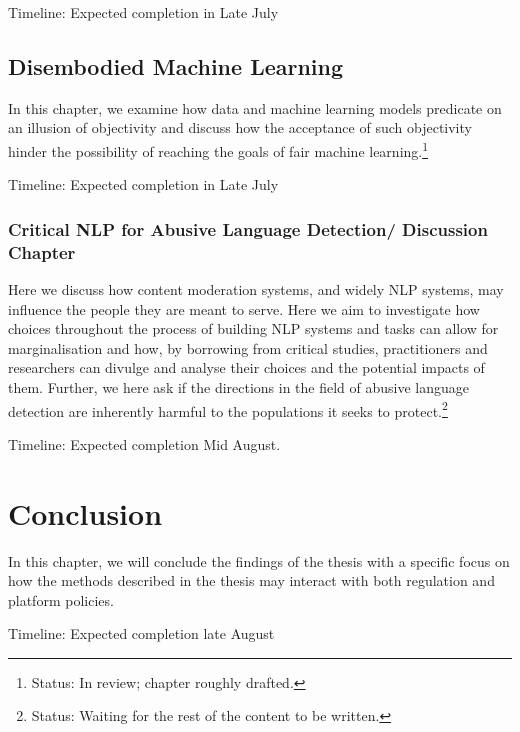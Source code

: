 {Timeline: Expected completion in Late July

\subsection{Disembodied Machine Learning}
In this chapter, we examine how data and machine learning models predicate on an illusion of objectivity and discuss how the acceptance of such objectivity hinder the possibility of reaching the goals of fair machine learning.\footnote{Status: In review; chapter roughly drafted.}

Timeline: Expected completion in Late July

\subsubsection{Critical NLP for Abusive Language Detection/ Discussion Chapter}
Here we discuss how content moderation systems, and widely NLP systems, may influence the people they are meant to serve. Here we aim to investigate how choices throughout the process of building NLP systems and tasks can allow for marginalisation and how, by borrowing from critical studies, practitioners and researchers can divulge and analyse their choices and the potential impacts of them. Further, we here ask if the directions in the field of abusive language detection are inherently harmful to the populations it seeks to protect.\footnote{Status: Waiting for the rest of the content to be written.}

Timeline: Expected completion Mid August.

\section{Conclusion}
In this chapter, we will conclude the findings of the thesis with a specific focus on how the methods described in the thesis may interact with both regulation and platform policies.

Timeline: Expected completion late August
}